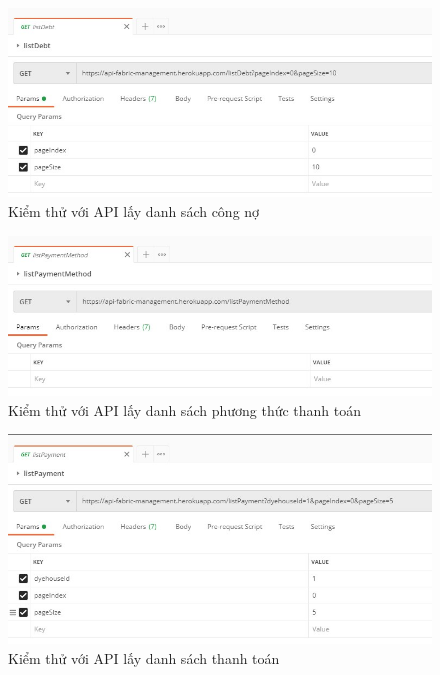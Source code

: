 \begin{figure}[H]
    \begin{center}
        \includegraphics[width=12cm]{Image/API/10_listDebt.jpg}
        \caption{Kiểm thử với API lấy danh sách công nợ}
        \label{listDebt}
    \end{center}
\end{figure}
\begin{figure}[H]
    \begin{center}
        \includegraphics[width=12cm]{Image/API/11_listPaymentMethod.jpg}
        \caption{Kiểm thử với API lấy danh sách phương thức thanh toán}
        \label{listPaymentMethod}
    \end{center}
\end{figure}
\begin{figure}[H]
    \begin{center}
        \includegraphics[width=12cm]{Image/API/12_listPayment.jpg}
        \caption{Kiểm thử với API lấy danh sách thanh toán}
        \label{listPayment}
    \end{center}
\end{figure}
